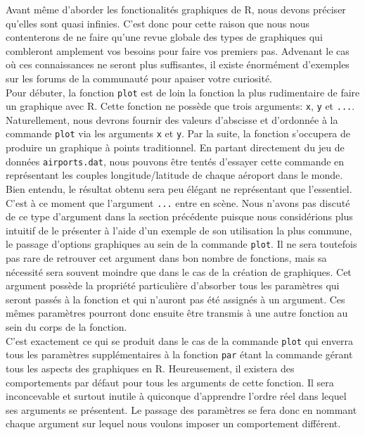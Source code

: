 Avant même d'aborder les fonctionalités graphiques de R, nous devons préciser qu'elles sont quasi infinies. C'est donc pour cette raison que nous nous contenterons de ne faire qu'une revue globale des types de graphiques qui combleront amplement vos besoins pour faire vos premiers pas. Advenant le cas où ces connaissances ne seront plus suffisantes, il existe énormément d'exemples sur les forums de la communauté pour apaiser votre curiosité. \\

Pour débuter, la fonction \texttt{plot} \cite{Rfunction:plot} est de loin la fonction la plus rudimentaire de faire un graphique avec R. Cette fonction ne possède que trois arguments: \texttt{x}, \texttt{y} et \texttt{...}. Naturellement, nous devrons fournir des valeurs d'abscisse et d'ordonnée à la commande \texttt{plot} via les arguments \texttt{x} et \texttt{y}. Par la suite, la fonction s'occupera de produire un graphique à points traditionnel. En partant directement du jeu de données \texttt{airports.dat}, nous pouvons être tentés d'essayer cette commande en représentant les couples longitude/latitude de chaque aéroport dans le monde. Bien entendu, le résultat obtenu sera peu élégant ne représentant que l'essentiel. \\

C'est à ce moment que l'argument \texttt{...} entre en scène. Nous n'avons pas discuté de ce type d'argument dans la section précédente puisque nous considérions plus intuitif de le présenter à l'aide d'un exemple de son utilisation la plus commune, le passage d'options graphiques au sein de la commande \texttt{plot}. Il ne sera toutefois pas rare de retrouver cet argument dans bon nombre de fonctions, mais sa nécessité sera souvent moindre que dans le cas de la création de graphiques. Cet argument possède la propriété particulière d'absorber tous les paramètres qui seront passés à la fonction et qui n'auront pas été assignés à un argument. Ces mêmes paramètres pourront donc ensuite être transmis à une autre fonction au sein du corps de la fonction. \\

C'est exactement ce qui se produit dans le cas de la commande \texttt{plot} qui enverra tous les paramètres supplémentaires à la fonction \texttt{par} \cite{Rfunction:par} étant la commande gérant tous les aspects des graphiques en R. Heureusement, il existera des comportements par défaut pour tous les arguments de cette fonction. Il sera inconcevable et surtout inutile à quiconque d'apprendre l'ordre réel dans lequel ses arguments se présentent. Le passage des paramètres se fera donc en nommant chaque argument sur lequel nous voulons imposer un comportement différent. \\

